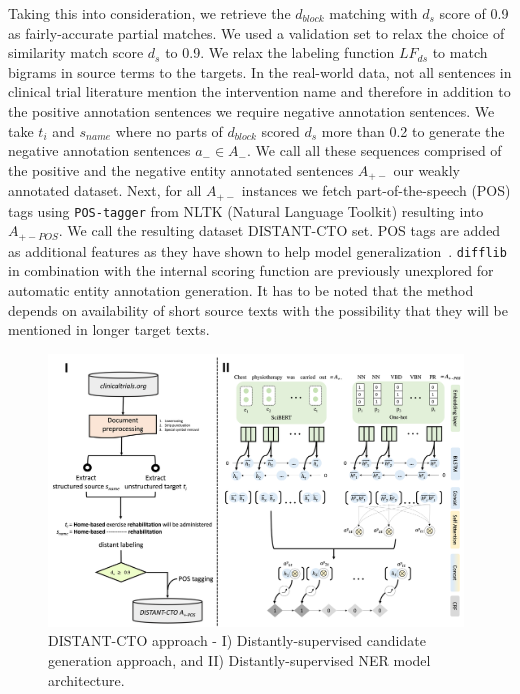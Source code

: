 \documentclass[11pt]{article}
\begin{document}
Taking this into consideration, we retrieve the $d_{block}$ matching with $d_s$ score of 0.9 as fairly-accurate partial matches.
We used a validation set to relax the choice of similarity match score $d_s$ to 0.9.
We relax the labeling function $LF_{ds}$ to match bigrams in source terms to the targets.
In the real-world data, not all sentences in clinical trial literature mention the intervention name and therefore in addition to the positive annotation sentences we require negative annotation sentences.
We take $t_i$ and $s_{name}$ where no parts of $d_{block}$ scored $d_s$ more than 0.2 to generate the negative annotation sentences $a_{-} \in A_{-}$.
We call all these sequences comprised of the positive and the negative entity annotated sentences $A_{+-}$ our weakly annotated dataset.
Next, for all $A_{+-}$ instances we fetch part-of-the-speech (POS) tags using {\tt POS-tagger} from NLTK (Natural Language Toolkit) resulting into $A_{+-POS}$.
We call the resulting dataset DISTANT-CTO set.
POS tags are added as additional features as they have shown to help model generalization~\cite{augenstein2017generalisation}.
{\tt difflib} in combination with the internal scoring function are previously unexplored for automatic entity annotation generation.
It has to be noted that the method depends on availability of short source texts with the possibility that they will be mentioned in longer target texts.
%
%
%
\begin{figure}[ht]
    \centering
    \includegraphics[width=0.98\textwidth]{figures/process.png}
    \caption{DISTANT-CTO approach - I) Distantly-supervised candidate generation approach, and II) Distantly-supervised NER model architecture.}
    \label{fig:approach}
\end{figure}
%
%
%
\end{document}

